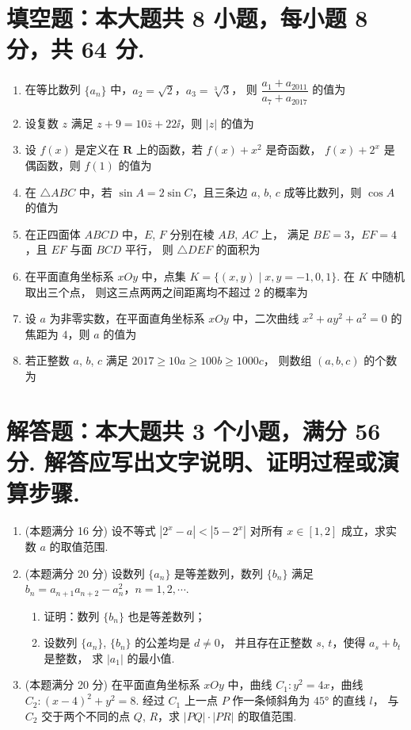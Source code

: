 \documentclass{chsmc}
\begin{document}
\section{填空题：本大题共 8 小题，每小题 8 分，共 64 分.}

\begin{enumerate}
  \item 在等比数列 $\{a_n\}$ 中，$a_2 = \sqrt{2}$，$a_3 = \sqrt[3]{3}$，
    则 $\dfrac{a_1 + a_{2011}}{a_7 + a_{2017}}$ 的值为 \blankline
  \item 设复数 $z$ 满足 $z + 9 = 10\bar{z} + 22\ii$，则 $|z|$ 的值为 \blankline
  \item 设 $f(x)$ 是定义在 $\mathbf{R}$ 上的函数，若 $f(x) + x^2$ 是奇函数，
    $f(x) + 2^x$ 是偶函数，则 $f(1)$ 的值为 \blankline
  \item 在 $\triangle ABC$ 中，若 $\sin A = 2\sin C$，且三条边 $a$, $b$, $c$
    成等比数列，则 $\cos A$ 的值为 \blankline
  \item 在正四面体 $ABCD$ 中，$E$, $F$ 分别在棱 $AB$, $AC$ 上，
    满足 $BE = 3$，$EF = 4$，且 $EF$ 与面 $BCD$ 平行，
    则 $\triangle DEF$ 的面积为 \blankline
  \item 在平面直角坐标系 $xOy$ 中，点集
    $K = \{(x,y) \mid x, y = -1, 0, 1\}$. 在 $K$ 中随机取出三个点，
    则这三点两两之间距离均不超过 $2$ 的概率为 \blankline
  \item 设 $a$ 为非零实数，在平面直角坐标系 $xOy$ 中，二次曲线
    $x^2 + ay^2 + a^2 = 0$ 的焦距为 $4$，则 $a$ 的值为 \blankline
  \item 若正整数 $a$, $b$, $c$ 满足 $2017 \geqslant 10a \geqslant 100b \geqslant 1000c$，
    则数组 $(a,b,c)$ 的个数为 \blankline
\end{enumerate}

\section{解答题：本大题共 3 个小题，满分 56 分. 解答应写出文字说明、证明过程或演算步骤.}

\begin{enumerate}[resume]
  \item (本题满分 16 分) 设不等式 $|2^x - a| < |5 - 2^x|$ 对所有
    $x \in [1,2]$ 成立，求实数 $a$ 的取值范围.
  \item (本题满分 20 分) 设数列 $\{a_n\}$ 是等差数列，数列 $\{b_n\}$ 满足
    $b_n = a_{n+1}a_{n+2} - a_n^2$，$n = 1, 2, \cdots$.
    \begin{enumerate}[(1)]
      \item 证明：数列 $\{b_n\}$ 也是等差数列；
      \item 设数列 $\{a_n\}$, $\{b_n\}$ 的公差均是 $d \neq 0$，
        并且存在正整数 $s$, $t$，使得 $a_s + b_t$ 是整数，
        求 $|a_1|$ 的最小值.
    \end{enumerate}
  \item (本题满分 20 分) 在平面直角坐标系 $xOy$ 中，曲线
    $C_1\colon y^2 = 4x$，曲线 $C_2\colon (x-4)^2 + y^2 = 8$.
    经过 $C_1$ 上一点 $P$ 作一条倾斜角为 $45°$ 的直线 $l$，
    与 $C_2$ 交于两个不同的点 $Q$, $R$，求 $|PQ|\cdot|PR|$ 的取值范围.
\end{enumerate}
\end{document}
